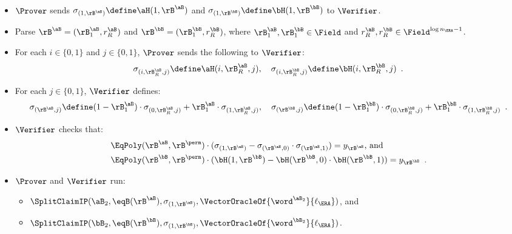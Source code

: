 \begin{tcolorbox}[breakable, enhanced, colback=white, boxrule=0.65pt]
\begin{enumerate}[nolistsep]
\begin{itemize}[nolistsep]
\begin{align*}
            &\EqPoly(\rB^{\aB}, \rB^{\perm}) \cdot ( \aH(1,\rB^{\aB}) - \aH(\rB^{\aB},0) \cdot \aH(\rB^{\aB},1) ) = y_{\rB^{\aB}} \text{, and } \\
            &\EqPoly(\rB^{\bB}, \rB^{\perm}) \cdot ( \bH(1,\rB^{\bB}) - \bH(\rB^{\bB},0) \cdot \bH(\rB^{\bB},1) ) = y_{\rB^{\bB}} \enspace.
        \end{align*}
        \item $\Prover$ sends $\sigma_{(1,\rB^{\aB})} \define \aH(1,\rB^{\aB})$ and $\sigma_{(1,\rB^{\bB})} \define \bH(1,\rB^{\bB})$ to $\Verifier$.
        \item Parse $\rB^{\aB} = (\rB^{\aB}_1, r^{\aB}_{R})$ and $\rB^{\bB} = (\rB^{\bB}_1, r^{\bB}_{R})$, where $\rB^{\aB}_1, \rB^{\bB}_1 \in \Field$ and $r^{\aB}_R, r^{\bB}_R \in \Field^{\log n_{\ERA} - 1}$.
        \item For each $i \in \{0,1\}$ and $j \in \{0,1\}$, $\Prover$ sends the following to $\Verifier$:
        \[  
            \sigma_{(i,\rB^{\aB}_R,j)} \define \aH(i,\rB^{\aB}_R,j), \quad \sigma_{(i,\rB^{\bB}_R,j)} \define \bH(i,\rB^{\bB}_R,j) \enspace .
        \]
        \item For each $j \in \{0,1\}$, $\Verifier$ defines:
        \[
            \sigma_{(\rB^{\aB},j)} \define (1 - \rB^{\aB}_1) \cdot \sigma_{(0,\rB^{\aB}_R,j)} + \rB^{\aB}_1 \cdot \sigma_{(1,\rB^{\aB}_R,j)} , \quad \sigma_{(\rB^{\bB},j)} \define (1 - \rB^{\bB}_1) \cdot \sigma_{(0,\rB^{\bB}_R,j)} + \rB^{\bB}_1 \cdot \sigma_{(1,\rB^{\bB}_R,j)} \enspace .
        \]
        \item $\Verifier$ checks that:
        \begin{align*}
            &\EqPoly(\rB^{\aB}, \rB^{\perm}) \cdot ( \sigma_{(1,\rB^{\aB})} - \sigma_{(\rB^{\aB},0)} \cdot \sigma_{(\rB^{\aB},1)} ) = y_{\rB^{\aB}} \text{, and } \\
            &\EqPoly(\rB^{\bB}, \rB^{\perm}) \cdot ( \bH(1,\rB^{\bB}) - \bH(\rB^{\bB},0) \cdot \bH(\rB^{\bB},1) ) = y_{\rB^{\bB}} \enspace.
        \end{align*}
        \item $\Prover$ and $\Verifier$ run:
        \begin{itemize}[nolistsep]
            \item $\SplitClaimIP(\aB_{2}, \eqB(\rB^{\aB}), \sigma_{(1,\rB^{\aB})}, \VectorOracleOf{\word^{\aB_{2}}}{\ell_{\ERA}})$, and
            \item $\SplitClaimIP(\bB_{2}, \eqB(\rB^{\bB}), \sigma_{(1,\rB^{\bB})}, \VectorOracleOf{\word^{\bB_{2}}}{\ell_{\ERA}})$.

\end{itemize}
\end{itemize}
\end{enumerate}
\end{tcolorbox}

